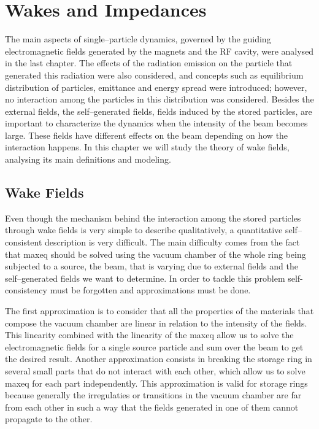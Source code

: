 \chapter{Wakes and Impedances}\label{cap:wakes_impedances}

    The main aspects of single--particle dynamics, governed by the guiding electromagnetic fields generated by the magnets and the RF cavity, were analysed in the last chapter. The effects of the radiation emission on the particle that generated this radiation were also considered, and concepts such as equilibrium distribution of particles, emittance and energy spread were introduced; however, no interaction among the particles in this distribution was considered. Besides the external fields, the self--generated fields, fields induced by the stored particles, are important to characterize the dynamics when the intensity of the beam becomes large. These fields have different effects on the beam depending on how the interaction happens. In this chapter we will study the theory of wake fields, analysing its main definitions and modeling.

\section{Wake Fields}\label{sec:wake_fields}

    Even though the mechanism behind the interaction among the stored particles through wake fields is very simple to describe qualitatively, a quantitative self--consistent description is very difficult. The main difficulty comes from the fact that \gls{maxeq} should be solved using the vacuum chamber of the whole ring being subjected to a source, the beam, that is varying due to external fields and the self--generated fields we want to determine. In order to tackle this problem self-consistency must be forgotten and approximations must be done.

    The first approximation is to consider that all the properties of the materials that compose the vacuum chamber are linear in relation to the intensity of the fields. This linearity combined with the linearity of the \gls{maxeq} allow us to solve the electromagnetic fields for a single source particle and sum over the beam to get the desired result. Another approximation consists in breaking the storage ring in several small parts that do not interact with each other, which allow us to solve \gls{maxeq} for each part independently. This approximation is valid for storage rings because generally the irregulaties or transitions in the vacuum chamber are far from each other in such a way that the fields generated in one of them cannot propagate to the other.

